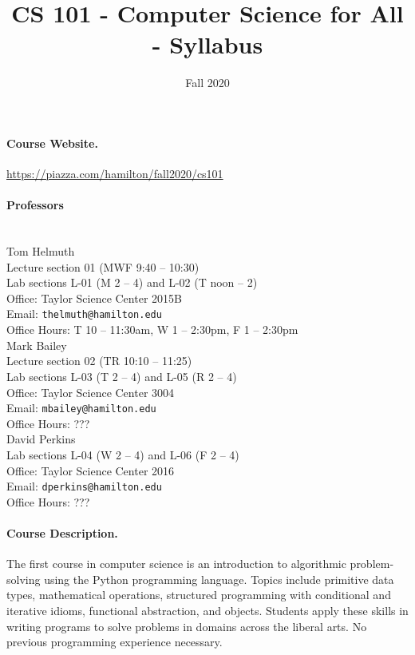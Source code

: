 \documentclass[12pt]{article}
\title{CS 101 - Computer Science for All - Syllabus}
\author{}
\date{Fall 2020}
\begin{document}
\maketitle

\paragraph*{Course Website.} \url{https://piazza.com/hamilton/fall2020/cs101}

\paragraph*{Professors} ~\\

\noindent
Tom Helmuth \\
Lecture section 01 (MWF 9:40 -- 10:30)\\
Lab sections L-01 (M 2 -- 4) and L-02 (T noon -- 2) \\
Office: Taylor Science Center 2015B \\
Email: \texttt{thelmuth@hamilton.edu}\\
Office Hours: T 10 -- 11:30am, W 1 -- 2:30pm, F 1 -- 2:30pm \\

\noindent
Mark Bailey \\
Lecture section 02 (TR 10:10 -- 11:25)\\
Lab sections L-03 (T 2 -- 4) and L-05 (R 2 -- 4) \\
Office: Taylor Science Center 3004 \\
Email: \texttt{mbailey@hamilton.edu}\\
Office Hours: ??? \\

\noindent
David Perkins \\
Lab sections L-04 (W 2 -- 4) and L-06 (F 2 -- 4) \\
Office: Taylor Science Center 2016 \\
Email: \texttt{dperkins@hamilton.edu}\\
Office Hours: ???

\paragraph*{Course Description.} The first course in computer science is an introduction to algorithmic problem-solving using the Python programming language. Topics include primitive data types, mathematical operations, structured programming with conditional and iterative idioms, functional abstraction, and objects. Students apply these skills in writing programs to solve problems in domains across the liberal arts. No previous programming experience necessary.
\end{document}
